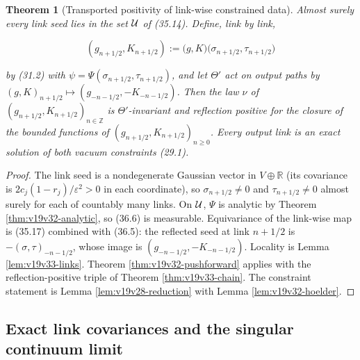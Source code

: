 \documentclass[11pt]{article}
\newtheorem{theorem}{Theorem}[section]
\theoremstyle{remark}
\begin{document}
\begin{theorem}[Transported positivity of link-wise constrained data]
\label{thm:v19v33-transport}
Almost surely every link seed lies in the set \({\cal U}\) of (35.14).
Define, link by link,

\[
 (g_{n+1/2},K_{n+1/2}):=\bigl(g,K\bigr)\bigl(\sigma_{n+1/2},\tau_{n+1/2}\bigr)
                                                                    \tag{36.6}
\]

by (31.2) with \(\psi=\Psi(\sigma_{n+1/2},\tau_{n+1/2})\), and let
\(\Theta'\) act on output paths by
\((g,K)_{n+1/2}\mapsto(g_{-n-1/2},-K_{-n-1/2})\).  Then the law
\(\nu\) of \((g_{n+1/2},K_{n+1/2})_{n\in\mathbb Z}\) is
\(\Theta'\)-invariant and reflection positive for the closure of the
bounded functions of \((g_{n+1/2},K_{n+1/2})_{n\geq0}\).  Every output
link is an exact solution of both vacuum constraints (29.1).
\end{theorem}

\begin{proof}
The link seed is a nondegenerate Gaussian vector in \(V\oplus\mathbb R\)
(its covariance is \(2c_j(1-r_j)/\varepsilon^2>0\) in each coordinate),
so \(\sigma_{n+1/2}\neq0\) and \(\tau_{n+1/2}\neq0\) almost surely for
each of countably many links.  On \({\cal U}\), \(\Psi\) is analytic by
Theorem \ref{thm:v19v32-analytic}, so (36.6) is measurable.  Equivariance
of the link-wise map is (35.17) combined with (36.5): the reflected seed
at link \(n+1/2\) is \(-(\sigma,\tau)_{-n-1/2}\), whose image is
\((g_{-n-1/2},-K_{-n-1/2})\).  Locality is Lemma
\ref{lem:v19v33-links}.  Theorem \ref{thm:v19v32-pushforward} applies with
the reflection-positive triple of Theorem \ref{thm:v19v33-chain}.  The
constraint statement is Lemma \ref{lem:v19v28-reduction} with Lemma
\ref{lem:v19v32-hoelder}.
\end{proof}

\subsection{Exact link covariances and the singular continuum limit}
\end{document}
